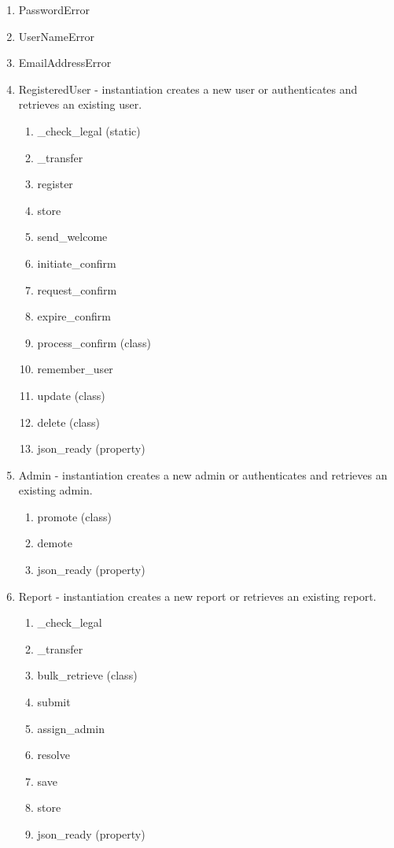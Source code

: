 \documentclass[12pt,letterpaper]{article}
\begin{document}
\begin{enumerate}
\item[] PasswordError
\item[] UserNameError
\item[] EmailAddressError
\item[] RegisteredUser - instantiation creates a new user or authenticates and retrieves an existing user. 
\begin{enumerate}
\item[] \_check\_legal (static)
\item[] \_transfer
\item[] register
\item[] store
\item[] send\_welcome 
\item[] initiate\_confirm
\item[] request\_confirm
\item[] expire\_confirm
\item[] process\_confirm (class)
\item[] remember\_user
\item[] update (class)
\item[] delete (class)
\item[] json\_ready (property)
\end{enumerate}
\item[] Admin - instantiation creates a new admin or authenticates and retrieves an existing admin. 
\begin{enumerate}
\item[] promote (class)
\item[] demote
\item[] json\_ready (property)
\end{enumerate}
\item[] Report - instantiation creates a new report or retrieves an existing report.
\begin{enumerate}
\item[] \_check\_legal
\item[] \_transfer
\item[] bulk\_retrieve (class)
\item[] submit
\item[] assign\_admin
\item[] resolve
\item[] save
\item[] store
\item[] json\_ready (property)
\end{enumerate}
\end{enumerate}
\end{document}
